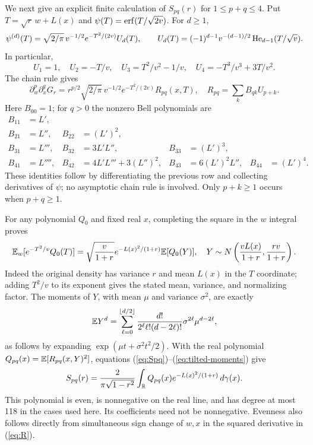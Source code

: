 We next give an explicit finite calculation of $S_{pq}(r)$ for
$1\leq p+q\leq4$. Put $T=\sqrt r\,w+L(x)$ and
$\psi(T)=\operatorname{erf}(T/\sqrt{2v})$. For $d\geq1$,
\[
 \psi^{(d)}(T)=\sqrt{2/\pi}\,v^{-1/2}e^{-T^2/(2v)}U_d(T),
 \qquad U_d(T)=(-1)^{d-1}v^{-(d-1)/2}\operatorname{He}_{d-1}(T/\sqrt v).
\]
In particular,
\[
 U_1=1,\quad U_2=-T/v,\quad U_3=T^2/v^2-1/v,
 \quad U_4=-T^3/v^3+3T/v^2.
\]
The chain rule gives
\begin{equation}\label{eq:R}
 \partial_w^p\partial_x^qG_r
 =r^{p/2}\sqrt{2/\pi}\,v^{-1/2}e^{-T^2/(2v)}R_{pq}(x,T),
 \quad R_{pq}=\sum_k B_{qk}U_{p+k}.
\end{equation}
Here $B_{00}=1$; for $q>0$ the nonzero Bell polynomials are
\begin{align*}
 B_{11}&=L',\\
 B_{21}&=L'',&B_{22}&=(L')^2,\\
 B_{31}&=L''',&B_{32}&=3L'L'',&B_{33}&=(L')^3,\\
 B_{41}&=L'''',&B_{42}&=4L'L'''+3(L'')^2,&
 B_{43}&=6(L')^2L'',&B_{44}&=(L')^4.
\end{align*}
These identities follow by differentiating the previous row and
collecting derivatives of $\psi$; no asymptotic chain rule is involved.
Only $p+k\geq1$ occurs when $p+q\geq1$.

For any polynomial $Q_0$ and fixed real $x$, completing the square in the
$w$ integral proves
\begin{equation}\label{eq:tilt}
 \mathbb E_w[e^{-T^2/v}Q_0(T)]
 =\sqrt{\frac v{1+r}}e^{-L(x)^2/(1+r)}\mathbb E[Q_0(Y)],
 \quad Y\sim N\left(\frac{vL(x)}{1+r},\frac{rv}{1+r}\right).
\end{equation}
Indeed the original density has variance $r$ and mean $L(x)$ in the
$T$ coordinate; adding $T^2/v$ to its exponent gives the stated mean,
variance, and normalizing factor. The moments of $Y$, with mean $\mu$
and variance $\sigma^2$, are exactly
\begin{equation}\label{eq:tilted-moments}
 \mathbb E Y^d=\sum_{\ell=0}^{\lfloor d/2\rfloor}
 \frac{d!}{2^\ell\ell!(d-2\ell)!}\sigma^{2\ell}\mu^{d-2\ell},
\end{equation}
as follows by expanding $\exp(\mu t+\sigma^2t^2/2)$.
With the real polynomial
$Q_{pq}(x)=\mathbb E[R_{pq}(x,Y)^2]$, equations
(\ref{eq:Spq})--(\ref{eq:tilted-moments}) give
\begin{equation}\label{eq:S-integral}
 S_{pq}(r)=\frac{2}{\pi\sqrt{1-r^2}}
       \int_\mathbb R Q_{pq}(x)e^{-L(x)^2/(1+r)}\,d\gamma(x).
\end{equation}
This polynomial is even, is nonnegative on the real line, and has degree
at most 118 in the cases used here. Its coefficients need not be
nonnegative. Evenness also follows directly from simultaneous sign
change of $w,x$ in the squared derivative in (\ref{eq:R}).

